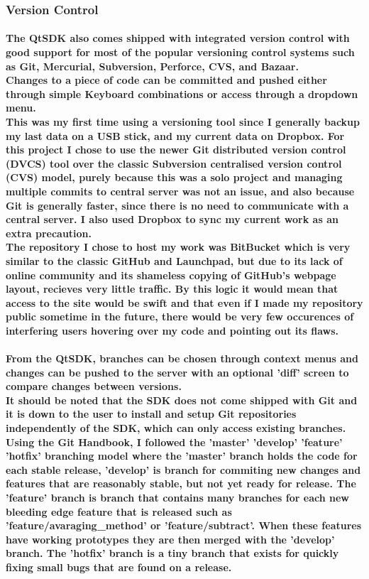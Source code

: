 \documentclass[11pt]{article} %
\begin{document}
\subsubsection{Version Control}
\paragraph{The QtSDK also comes shipped with integrated version control with good support for most of the popular versioning control systems such as Git, Mercurial, Subversion, Perforce, CVS, and Bazaar.\\
Changes to a piece of code can be committed and pushed either through simple Keyboard combinations or access through a dropdown menu.\\
This was my first time using a versioning tool since I generally backup my last data on a USB stick, and my current data on Dropbox.
For this project I chose to use the newer Git distributed version control (DVCS) tool over the classic Subversion centralised version control (CVS) model, purely because this was a solo project and managing multiple commits to central server was not an issue, and also because Git is generally faster, since there is no need to communicate with a central server. I also used Dropbox to sync my current work as an extra precaution.\\
The repository I chose to host my work was BitBucket which is very similar to the classic GitHub and Launchpad, but due to its lack of online community and its shameless copying of GitHub's webpage layout, recieves very little traffic\cite{gitvs}. By this logic it would mean that access to the site would be swift and that even if I made my repository public sometime in the future, there would be very few occurences of interfering users hovering over my code and pointing out its flaws.}
\paragraph{From the QtSDK, branches can be chosen through context menus and changes can be pushed to the server with an optional 'diff' screen to compare changes between versions.\\It should be noted that the SDK does not come shipped with Git and it is down to the user to install and setup Git repositories independently of the SDK, which can only access existing branches.\\Using the Git Handbook, I followed the 'master' 'develop' 'feature' 'hotfix' branching model where the 'master' branch holds the code for each stable release, 'develop' is branch for commiting new changes and features that are reasonably stable, but not yet ready for release. The 'feature' branch is branch that contains many branches for each new bleeding edge feature that is released  such as 'feature/avaraging\_method' or 'feature/subtract'. When these features have working prototypes they are then merged with the 'develop' branch. The 'hotfix' branch is a tiny branch that exists for quickly fixing small bugs that are found on a release.}
\end{document}
